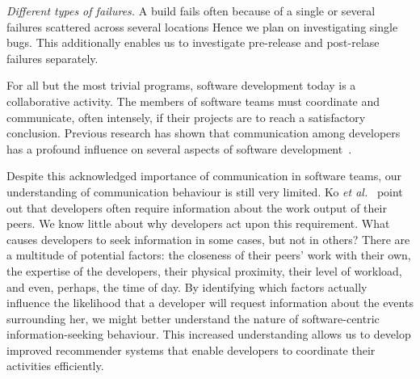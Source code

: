 \documentclass[12pt,oneside]{book}
\begin{document}
\emph{Different types of failures.}
A build fails often because of a single or several failures scattered across several locations
Hence we plan on
investigating single bugs. This additionally enables us to investigate pre-release and post-relase failures separately.















\label{chap:talk}

For all but the most trivial programs, software development today is a collaborative activity. The members of software teams must coordinate and communicate, often intensely, if their projects are to reach a satisfactory conclusion.
Previous research has shown that communication among developers has a profound influence on several aspects of software development~\cite{hinds:cscw:2006,wolf:icse:2009}.

Despite this acknowledged importance of communication in software teams, our understanding of communication behaviour is still very limited. Ko \emph{et al.}~\cite{ko:icse:2007} point out that developers often require information about the work output of their peers.  We know little about why developers act upon this requirement. What causes developers to seek information in some cases, but not in others? There are a multitude of potential factors: the closeness of their peers' work with their own, the expertise of the developers, their physical proximity, their level of workload, and even, perhaps, the time of day. By identifying which factors actually influence the likelihood that a developer will request information about the events surrounding her, we might better understand the nature of software-centric information-seeking behaviour. This increased understanding allows us to develop improved recommender systems that enable developers to coordinate their activities efficiently.
\end{document}
